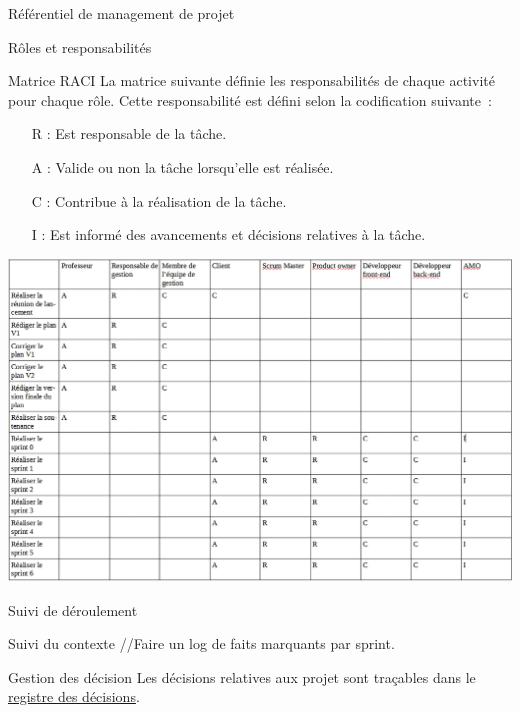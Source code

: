 \documentclass[]{article}
\begin{document}
{\begin{section}{\label{sec:Référentiel de management de projet}Référentiel de management de projet}
\begin{subsection}{\label{sec:Rôles et responsabilités}Rôles et responsabilités}
         \begin{subsubsection}{\label{sec:Matrice RACI}Matrice RACI}
             La matrice suivante définie les responsabilités de chaque activité pour chaque rôle. Cette responsabilité est défini selon la codification suivante :
             \begin{itemize}
                 \item[R]: Est responsable de la tâche.
                 \item[A] : Valide ou non la tâche lorsqu’elle est réalisée.
                 \item[C] : Contribue à la réalisation de la tâche.
                 \item[I] : Est informé des avancements et décisions relatives à la tâche.
             \end{itemize}
             \begin{landscape}
                 \includegraphics[scale=0.6]{documents/IMG/RACI}
             \end{landscape}
         \end{subsubsection}

     \end{subsection}

     \begin{subsection}{\label{sec:Suivi de déroulement}Suivi de déroulement}
         \begin{subsubsection}{\label{sec:Suivi du contexte}Suivi du contexte}
             //Faire un log de faits marquants par sprint.
         \end{subsubsection}

         \begin{subsubsection}{\label{sec:Gestion des décision}Gestion des décision}
             Les décisions relatives aux projet sont traçables dans le \href{documents/Registre_des_décisions.pdf}{registre des décisions}.


\end{subsubsection}
\end{subsection}
\end{section}}
\end{document}
